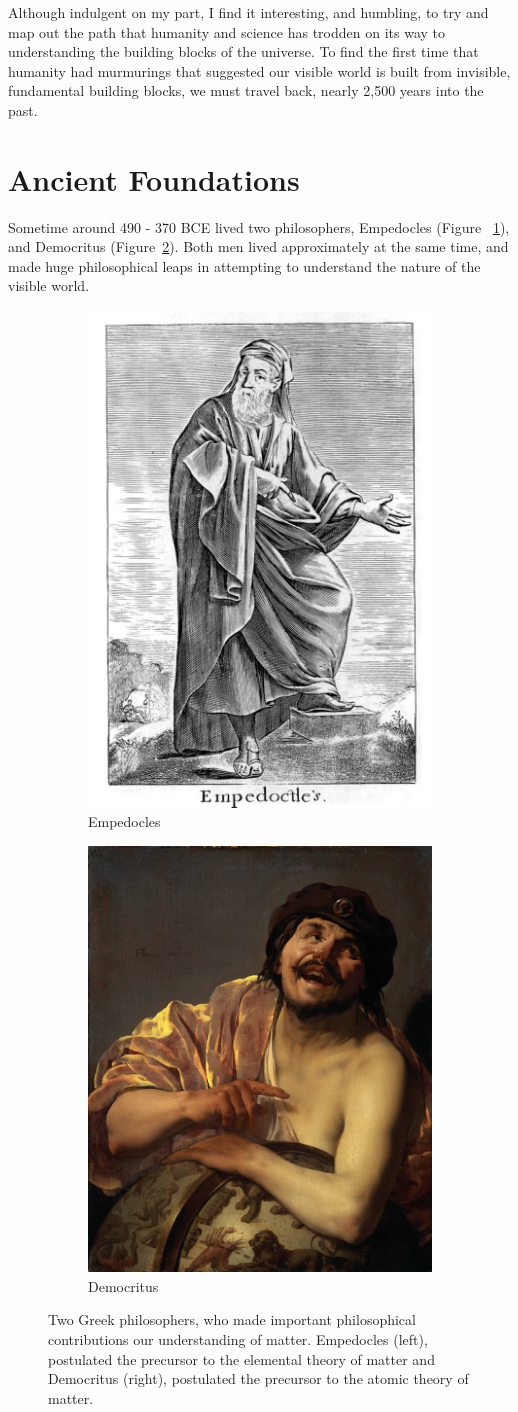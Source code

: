 Although indulgent on my part, I find it interesting, and humbling, to try and
map out the path that humanity and science has trodden on its way to
understanding the building blocks of the universe. To find the first time that
humanity had murmurings that suggested our visible world is built from
invisible, fundamental building blocks, we must travel back, nearly 2,500 years
into the past.

\section{Ancient Foundations}
Sometime around 490 - 370 BCE lived two philosophers, Empedocles (Figure
~\ref{fig:empedocles}), and Democritus (Figure~\ref{fig:democritus}). Both men
lived approximately at the same time, and made huge philosophical leaps in
attempting to understand the nature of the visible world.

\begin{figure}[ht]
	\centering
	\begin{subfigure}{.5\textwidth}
		\centering
		\includegraphics[width=0.4\linewidth]{./figures/empedocles.jpg}
		\caption{Empedocles \cite{Stanley1655}}
		\label{fig:empedocles}
	\end{subfigure}%
	\begin{subfigure}{0.5\textwidth}
		\centering
		\includegraphics[width=0.4\linewidth]{./figures/democritus.jpg}
		\caption{Democritus \cite{Brugghen1628}}
		\label{fig:democritus}
	\end{subfigure}
  \caption{ 
    Two Greek philosophers, who made important philosophical
    contributions our understanding of matter. Empedocles (left), postulated the
    precursor to the elemental theory of matter\cite{Long1949} and Democritus
    (right), postulated the precursor to the atomic theory of matter.  
  }
	\label{fig:atomists}
\end{figure}

